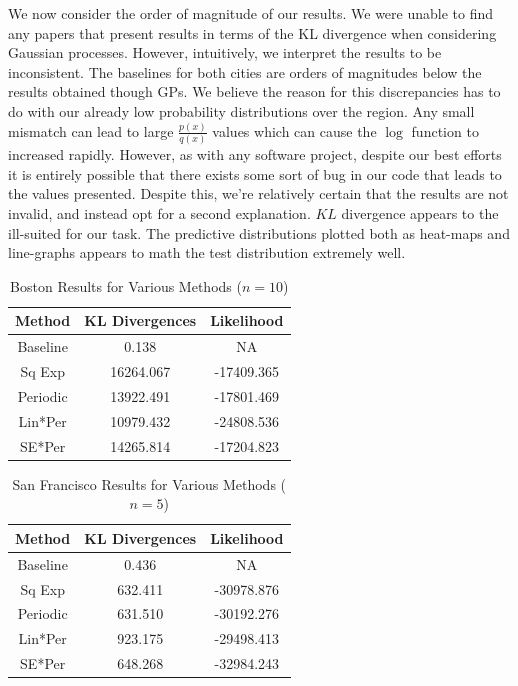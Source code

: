 \documentclass[letterpaper, 11 pt, conference]{ieeeconf}  %
\begin{document}
We now consider the order of magnitude of our results. We were unable to find any papers that present results in terms of the KL divergence when considering Gaussian processes. However, intuitively, we interpret the results to be inconsistent. The baselines for both cities are orders of magnitudes below the results obtained though GPs. We believe the reason for this discrepancies has to do with our already low probability distributions over the region. Any small mismatch can lead to large $\frac{p(x)}{q(x)}$ values which can cause the $\log$ function to increased rapidly. However, as with any software project, despite our best efforts it is entirely possible that there exists some sort of bug in our code that leads to the values presented. Despite this, we're relatively certain that the results are not invalid, and instead opt for a second explanation. $KL$ divergence appears to the ill-suited for our task. The predictive distributions plotted both as heat-maps and line-graphs appears to math the test distribution extremely well.   

\begin{table}[h]
\caption{Boston Results for Various Methods ($n=10$)}
\label{table_bos}
\begin{center}
\begin{tabular}{|c|c|c|}
\hline
Method & KL Divergences & Likelihood\\
\hline
Baseline & 0.138 & NA \\
Sq Exp & 16264.067 & -17409.365 \\
Periodic & 13922.491 & -17801.469 \\
Lin*Per & 10979.432 & -24808.536 \\
SE*Per & 14265.814 & -17204.823 \\
\hline
\end{tabular}
\end{center}
\end{table}


\begin{table}[h]
\caption{San Francisco Results for Various Methods ($n=5$)}
\label{table_sf}
\begin{center}
\begin{tabular}{|c|c|c|}
\hline
Method & KL Divergences & Likelihood\\
\hline
Baseline & 0.436 & NA \\
Sq Exp & 632.411 & -30978.876 \\
Periodic & 631.510 & -30192.276 \\
Lin*Per & 923.175 & -29498.413 \\
SE*Per & 648.268 & -32984.243 \\
\hline
\end{tabular}
\end{center}
\end{table}
\end{document}
